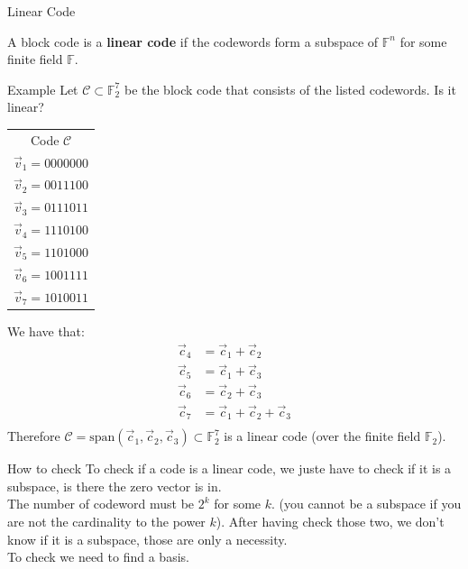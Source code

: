 \begin{parag}{Linear Code}
    \begin{definition}
        A block code is a \textbf{linear code} if the codewords form a subspace of $\mathbb{F}^n$ for some finite field $\mathbb{F}$.
    \end{definition}
    \begin{subparag}{Example}
        Let $\mathcal{C} \subset \mathbb{F}_2^7$ be the block code that consists of the listed codewords. Is it linear?
        
        \begin{center}
        \begin{tabular}{|c|}
            Code $\mathcal{C}$ \\
            $\vec{v}_1 = 0000000$ \\
            $\vec{v}_2 = 0011100$ \\
            $\vec{v}_3 = 0111011$ \\
            $\vec{v}_4 = 1110100$ \\
            $\vec{v}_5 = 1101000$ \\
            $\vec{v}_6 = 1001111$ \\
            $\vec{v}_7 = 1010011$ \\
        \end{tabular}
        \end{center}
        
        We have that:
        \begin{align*} 
            \vec{c}_4 &=  \vec{c}_1 + \vec{c}_2\\
            \vec{c}_5 &=  \vec{c}_1 + \vec{c}_3\\
            \vec{c}_6 &=  \vec{c}_2 + \vec{c}_3\\
            \vec{c}_7 &=  \vec{c}_1 + \vec{c}_2 + \vec{c}_3\\
        \end{align*}
        Therefore $\mathcal{C} =  \text{span}\left(\vec{c}_1, \vec{c}_2, \vec{c}_3\right) \subset \mathbb{F}_2^7$ is a linear code (over the finite field $\mathbb{F}_2$).
    \end{subparag}
    \begin{subparag}{How to check}
        To check if a code is a linear code, we juste have to check if it is a subspace, is there the zero vector is in.\\
        The number of codeword must be $2^k$ for some $k$. (you cannot be a subspace if you are not the cardinality to the power $k$). After having check those two, we don't know if it is a subspace, those are only a necessity.\\
        To check we need to find a basis.
    \end{subparag}
\end{parag}


